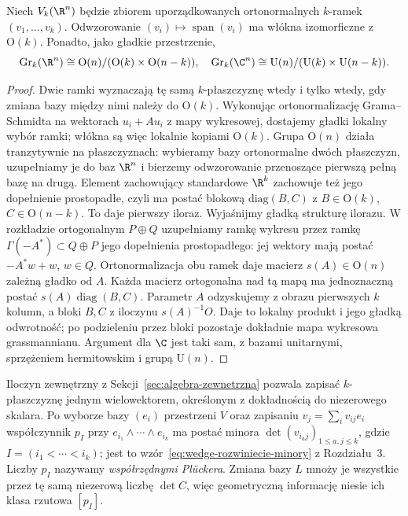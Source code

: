 \begin{stwierdzenie}
\label{prop:grass-stiefel}
Niech $V_k(\R^n)$ będzie zbiorem uporządkowanych
ortonormalnych $k$-ramek $(v_1,\ldots,v_k)$.
Odwzorowanie $(v_i)\mapsto\operatorname{span}(v_i)$ ma
włókna izomorficzne z $\mathrm O(k)$.
Ponadto, jako gładkie przestrzenie,
\[
 \operatorname{Gr}_k(\R^n)
   \cong\mathrm O(n)/(\mathrm O(k)\times\mathrm O(n-k)),
\quad
 \operatorname{Gr}_k(\C^n)
   \cong\mathrm U(n)/(\mathrm U(k)\times\mathrm U(n-k)).
\]
\end{stwierdzenie}
\begin{proof}
Dwie ramki wyznaczają tę samą $k$-płaszczyznę wtedy
i tylko wtedy, gdy zmiana bazy między nimi należy do
$\mathrm O(k)$. Wykonując ortonormalizację Grama--Schmidta
na wektorach $u_i+Au_i$ z mapy wykresowej, dostajemy
gładki lokalny wybór ramki; włókna są więc lokalnie
kopiami $\mathrm O(k)$. Grupa $\mathrm O(n)$ działa
tranzytywnie na płaszczyznach: wybieramy bazy ortonormalne
dwóch płaszczyzn, uzupełniamy je do baz $\R^n$ i bierzemy
odwzorowanie przenoszące pierwszą pełną bazę na drugą.
Element zachowujący standardowe $\R^k$ zachowuje też
jego dopełnienie prostopadłe, czyli ma postać blokową
$\mathrm{diag}(B,C)$ z $B\in\mathrm O(k)$,
$C\in\mathrm O(n-k)$. To daje pierwszy iloraz.
Wyjaśnijmy gładką strukturę ilorazu. W rozkładzie ortogonalnym
$P\oplus Q$ uzupełniamy ramkę wykresu przez ramkę
$\Gamma(-A^*)\subset Q\oplus P$ jego dopełnienia prostopadłego:
jej wektory mają postać $-A^*w+w$, $w\in Q$.
Ortonormalizacja obu ramek daje macierz $s(A)\in\mathrm O(n)$
zależną gładko od $A$. Każda macierz ortogonalna nad tą mapą
ma jednoznaczną postać $s(A)\operatorname{diag}(B,C)$.
Parametr $A$ odzyskujemy z obrazu pierwszych $k$ kolumn,
a bloki $B,C$ z iloczynu $s(A)^{-1}O$. Daje to lokalny
produkt i jego gładką odwrotność; po podzieleniu przez bloki
pozostaje dokładnie mapa wykresowa grassmannianu.
Argument dla $\C$ jest taki sam, z bazami unitarnymi,
sprzężeniem hermitowskim i grupą $\mathrm U(n)$.
\end{proof}

Iloczyn zewnętrzny z Sekcji~\ref{sec:algebra-zewnetrzna}
pozwala zapisać $k$-płaszczyznę jednym wielowektorem,
określonym z dokładnością do niezerowego skalara.
Po wyborze bazy $(e_i)$ przestrzeni $V$ oraz zapisaniu
$v_j=\sum_i v_{ij}e_i$ współczynnik
$p_I$ przy $e_{i_1}\wedge\cdots\wedge e_{i_k}$
ma postać minora
$\det(v_{i_a j})_{1\leq a,j\leq k}$, gdzie
$I=(i_1<\cdots<i_k)$; jest to
wzór~\eqref{eq:wedge-rozwiniecie-minory} z Rozdziału~3.
Liczby $p_I$ nazywamy \emph{współrzędnymi Plückera}.
Zmiana bazy $L$ mnoży je wszystkie przez tę samą
niezerową liczbę $\det C$, więc geometryczną informację
niesie ich klasa rzutowa $[p_I]$.

